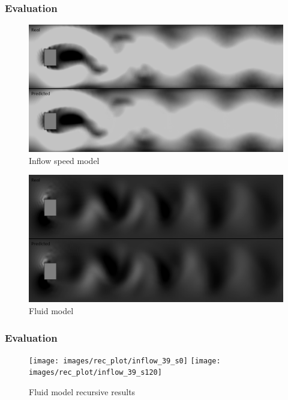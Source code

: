 \documentclass[18pt, xcolor=table]{beamer}
\begin{document}
\begin{frame}[t]
  \frametitle{Evaluation}

  \begin{center}
    \begin{figure}[htb]
      \includegraphics[scale=0.15]{images/flows/x_speed_good}
      \vspace{-0.2cm}
      \caption{Inflow speed model}
    \end{figure}
    \begin{figure}[htb]
      \includegraphics[scale=0.15]{images/flows/y_fluid_good}
      \vspace{-0.2cm}
      \caption{Fluid model}
    \end{figure}
  \end{center}
\end{frame}

\begin{frame}[t]
  \frametitle{Evaluation}

  \begin{center}
    \begin{figure}[htb]
      \texttt{[image: images/rec\_plot/inflow\_39\_s0]}
      \texttt{[image: images/rec\_plot/inflow\_39\_s120]}
      \caption{Fluid model recursive results}
    \end{figure}
  \end{center}

\end{frame}
\end{document}
